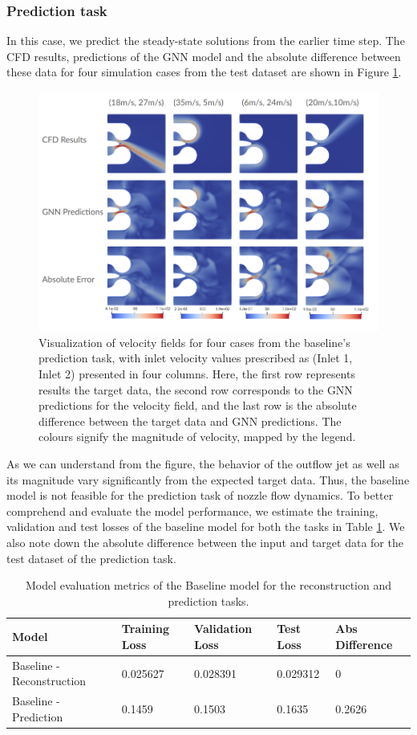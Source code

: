 \subsubsection{Prediction task}
In this case, we predict the steady-state solutions from the earlier time step. The CFD results, predictions of the GNN model and the absolute difference between these data for four simulation cases from the test dataset are shown in Figure \ref{blpred}.
\begin{figure}[ht]
    \centering
    \includegraphics[width=14cm]{images/Methodology/Baselineprediction.png}
    \caption{Visualization of velocity fields for four cases from the baseline's prediction task, with inlet velocity values prescribed as (Inlet 1, Inlet 2) presented in four columns. Here, the first row represents results the target data, the second row corresponds to the GNN predictions for the velocity field, and the last row is the absolute difference between the target data and GNN predictions. The colours signify the magnitude of velocity, mapped by the legend.} 
    \label{blpred}
\end{figure}
As we can understand from the figure, the behavior of the outflow jet as well as its magnitude vary significantly from the expected target data. Thus, the baseline model is not feasible for the prediction task of nozzle flow dynamics. To better comprehend and evaluate the model performance, we estimate the training, validation and test losses of the baseline model for both the tasks in Table \ref{table:perform}. We also note down the absolute difference between the input and target data for the test dataset of the prediction task.  
\begin{table}[ht]
    \centering
    \caption{Model evaluation metrics of the Baseline model for the reconstruction and prediction tasks.} 
    \label{table:perform}
    \begin{tabular}{|l|l|l|l|l|}
    \hline
    \textbf{Model} & \textbf{Training Loss} & \textbf{Validation Loss} & \textbf{Test Loss} & \textbf{Abs Difference} \\
    \hline
    Baseline - Reconstruction & 0.025627 & 0.028391 & 0.029312 & 0\\
    \hline
    Baseline - Prediction & 0.1459 & 0.1503 & 0.1635 & 0.2626\\
    \hline
    \end{tabular}
    \end{table}   
